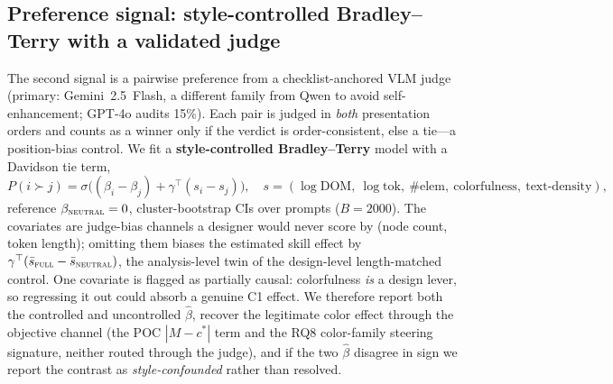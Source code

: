 \subsection{Preference signal: style-controlled Bradley--Terry with a validated judge}
The second signal is a pairwise preference from a checklist-anchored VLM judge (primary:
Gemini~2.5~Flash, a different family from Qwen to avoid self-enhancement; GPT-4o audits 15\%).
Each pair is judged in \emph{both} presentation orders and counts as a winner only if the verdict
is order-consistent, else a tie---a position-bias control. We fit a \textbf{style-controlled
Bradley--Terry} model with a Davidson tie term,
\begin{equation}
P(i\succ j)=\sigma\!\big((\beta_i-\beta_j)+\gamma^{\top}(s_i-s_j)\big),\quad
s=(\log\text{DOM},\ \log\text{tok},\ \#\text{elem},\ \text{colorfulness},\ \text{text-density}),
\label{eq:bt}
\end{equation}
reference $\beta_{\textsc{neutral}}=0$, cluster-bootstrap CIs over prompts ($B{=}2000$). The covariates are
judge-bias channels a designer would never score by (node count, token length); omitting them
biases the estimated skill effect by $\gamma^{\top}(\bar s_{\textsc{full}}-\bar s_{\textsc{neutral}})$, the
analysis-level twin of the design-level length-matched control. One covariate is flagged as
partially causal: colorfulness \emph{is} a design lever, so regressing it out could absorb a
genuine C1 effect. We therefore report both the controlled and uncontrolled $\hat\beta$, recover
the legitimate color effect through the objective channel (the POC $|M-c^{*}|$ term and the RQ8
color-family steering signature, neither routed through the judge), and if the two $\hat\beta$
disagree in sign we report the contrast as \emph{style-confounded} rather than resolved.

